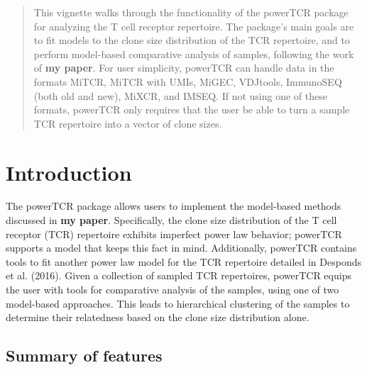 \documentclass[]{article}
\author{Hillary Koch}
\date{2 February 2018}
\theoremstyle{definition}
\theoremstyle{definition}
\theoremstyle{definition}
\theoremstyle{remark}
\begin{document}
\maketitle
\begin{abstract}
This vignette walks through the functionality of the powerTCR package
for analyzing the T cell receptor repertoire. The package's main goals
are to fit models to the clone size distribution of the TCR repertoire,
and to perform model-based comparative analysis of samples, following
the work of \textbf{my paper}. For user simplicity, powerTCR can handle
data in the formats MiTCR, MiTCR with UMIs, MiGEC, VDJtools, ImmunoSEQ
(both old and new), MiXCR, and IMSEQ. If not using one of these formats,
powerTCR only requires that the user be able to turn a sample TCR
repertoire into a vector of clone sizes.
\end{abstract}


{
\setcounter{tocdepth}{2}
\tableofcontents
\newpage
}
\section{Introduction}\label{introduction}

The powerTCR package allows users to implement the model-based methods
discussed in \textbf{my paper}. Specifically, the clone size
distribution of the T cell receptor (TCR) repertoire exhibits imperfect
power law behavior; powerTCR supports a model that keeps this fact in
mind. Additionally, powerTCR contains tools to fit another power law
model for the TCR repertoire detailed in Desponds et al. (2016). Given a
collection of sampled TCR repertoires, powerTCR equips the user with
tools for comparative analysis of the samples, using one of two
model-based approaches. This leads to hierarchical clustering of the
samples to determine their relatedness based on the clone size
distribution alone.

\subsection{Summary of features}\label{summary-of-features}
\end{document}
